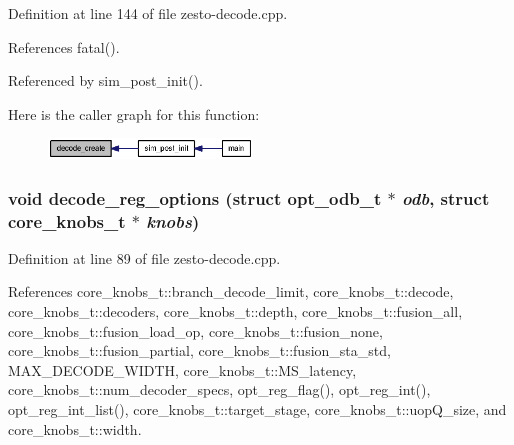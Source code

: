 Definition at line 144 of file zesto-decode.cpp.

References fatal().

Referenced by sim\_\-post\_\-init().

Here is the caller graph for this function:\nopagebreak
\begin{figure}[H]
\begin{center}
\leavevmode
\includegraphics[width=154pt]{zesto-decode_8h_4fc719f96861588f24dd802be6e2b0df_icgraph}
\end{center}
\end{figure}
\subsubsection[{decode\_\-reg\_\-options}]{\setlength{\rightskip}{0pt plus 5cm}void decode\_\-reg\_\-options (struct {\bf opt\_\-odb\_\-t} $\ast$ {\em odb}, \/  struct {\bf core\_\-knobs\_\-t} $\ast$ {\em knobs})}\label{zesto-decode_8h_22a8e8da3f62458e0ed1dd350cec4ae7}




Definition at line 89 of file zesto-decode.cpp.

References core\_\-knobs\_\-t::branch\_\-decode\_\-limit, core\_\-knobs\_\-t::decode, core\_\-knobs\_\-t::decoders, core\_\-knobs\_\-t::depth, core\_\-knobs\_\-t::fusion\_\-all, core\_\-knobs\_\-t::fusion\_\-load\_\-op, core\_\-knobs\_\-t::fusion\_\-none, core\_\-knobs\_\-t::fusion\_\-partial, core\_\-knobs\_\-t::fusion\_\-sta\_\-std, MAX\_\-DECODE\_\-WIDTH, core\_\-knobs\_\-t::MS\_\-latency, core\_\-knobs\_\-t::num\_\-decoder\_\-specs, opt\_\-reg\_\-flag(), opt\_\-reg\_\-int(), opt\_\-reg\_\-int\_\-list(), core\_\-knobs\_\-t::target\_\-stage, core\_\-knobs\_\-t::uopQ\_\-size, and core\_\-knobs\_\-t::width.